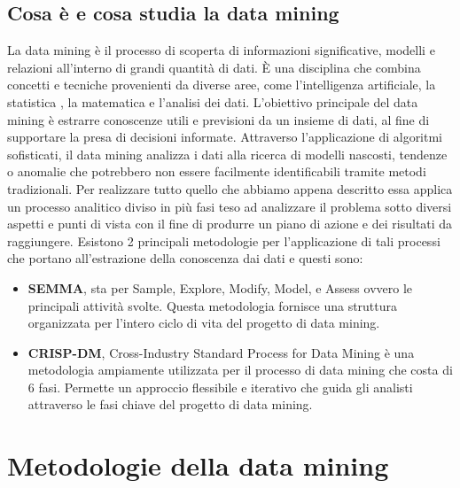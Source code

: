 \documentclass[italian,12pt,a4paper]{article}
\begin{document}
    \subsection{Cosa è e cosa studia la data mining}
    La data mining è il processo di scoperta di informazioni significative, modelli e relazioni all'interno di grandi quantità di dati. È una disciplina che combina concetti e tecniche provenienti da diverse aree, come l'intelligenza artificiale, la statistica , la matematica e l'analisi dei dati.
    L'obiettivo principale del data mining è estrarre conoscenze utili e previsioni da un insieme di dati, al fine di supportare la presa di decisioni informate. Attraverso l'applicazione di algoritmi sofisticati, il data mining analizza i dati alla ricerca di modelli nascosti, tendenze o anomalie che potrebbero non essere facilmente identificabili tramite metodi tradizionali. Per realizzare tutto quello che abbiamo appena descritto essa applica un processo analitico diviso in più fasi teso ad analizzare il problema sotto diversi aspetti e punti di vista con il fine di produrre un piano di azione e dei risultati da raggiungere. Esistono 2 principali metodologie per l'applicazione di tali processi che portano all'estrazione della conoscenza dai dati e questi sono:
    \\
    
    \begin{itemize}
			\item  \textbf{SEMMA}, sta per Sample, Explore, Modify, Model, e Assess ovvero le principali attività svolte. Questa metodologia fornisce una struttura organizzata per l'intero ciclo di vita del progetto di data mining.
			\item  \textbf{CRISP-DM}, Cross-Industry Standard Process for Data Mining è una metodologia ampiamente utilizzata per il processo di data mining che costa di 6 fasi. Permette  un approccio flessibile e iterativo che guida gli analisti attraverso le fasi chiave del progetto di data mining.   
		\end{itemize}

    \vspace{30pt}
    
   \section{Metodologie della data mining }
   
\end{document}
